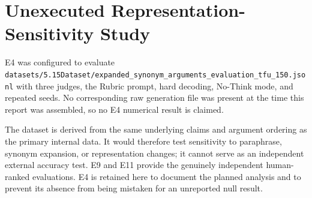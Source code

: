 \documentclass[11pt,twoside,a4paper]{report}
\begin{document}
\chapter{Unexecuted Representation-Sensitivity Study}
\label{app:e4}

E4 was configured to evaluate
\texttt{datasets/5.15Dataset/expanded\_synonym\_arguments\_evaluation\_tfu\_150.jsonl}
with three judges, the Rubric prompt, hard decoding, No-Think mode, and repeated
seeds.  No corresponding raw generation file was present at the time this report
was assembled, so no E4 numerical result is claimed.

The dataset is derived from the same underlying claims and argument ordering as
the primary internal data.  It would therefore test sensitivity to paraphrase,
synonym expansion, or representation changes; it cannot serve as an independent
external accuracy test.  E9 and E11 provide the genuinely independent human-ranked
evaluations.  E4 is retained here to document the planned analysis and to prevent
its absence from being mistaken for an unreported null result.
\end{document}
